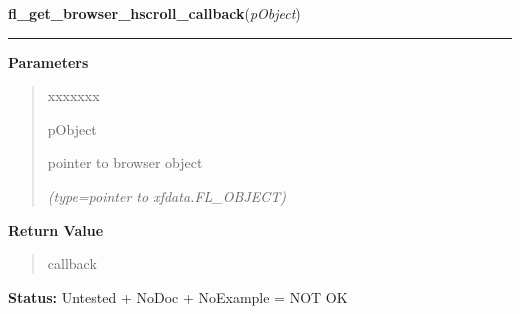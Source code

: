 \hspace{.8\funcindent}\begin{boxedminipage}{\funcwidth}

    \raggedright \textbf{fl\_get\_browser\_hscroll\_callback}(\textit{pObject})

    \vspace{-1.5ex}

    \rule{\textwidth}{0.5\fboxrule}
\setlength{\parskip}{2ex}
\setlength{\parskip}{1ex}
      \textbf{Parameters}
      \vspace{-1ex}

      \begin{quote}
        \begin{Ventry}{xxxxxxx}

          \item[pObject]

          pointer to browser object

            {\it (type=pointer to xfdata.FL\_OBJECT)}

        \end{Ventry}

      \end{quote}

      \textbf{Return Value}
    \vspace{-1ex}

      \begin{quote}
      callback

      \end{quote}

\textbf{Status:} Untested + NoDoc + NoExample = NOT OK



    \end{boxedminipage}

    \label{xformslib:library:fl_get_browser_vscroll_callback}

    \vspace{0.5ex}


